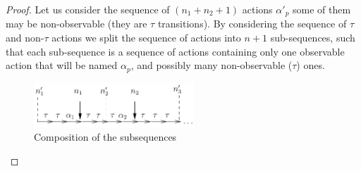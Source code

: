\documentclass{elsarticle}
\begin{document}
\begin{proof}
Let us consider the sequence of $(n_1+n_2+1)$  actions $\alpha'_p$ some of them may be non-observable (they are $\tau$ transitions). By considering the sequence of $\tau$ and non-$\tau$ actions we split the sequence of actions into $n+1$ sub-sequences, such that each sub-sequence is a sequence of actions containing  only one observable action that will be named $\alpha_p$, and possibly many non-observable ($\tau$) ones. 

\begin{figure}
\begin{center}
\includegraphics[width=6cm]{XFIG/proof-explain}
\end{center}\caption{Composition of the subsequences}\label{figproof}
\end{figure}


\end{proof}
\end{document}
